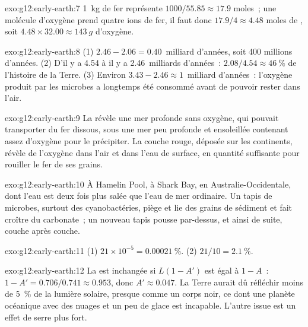 \begin{solution}{exo:g12:early-earth:7}
\qty{1}{kg} de fer représente $1000/55.85 \approx 17.9$ moles~; une
molécule d'oxygène prend quatre ions de fer, il faut donc
$17.9/4 \approx 4.48$ moles de
, soit $4.48 \times 32.00 \approx \qty{143}{g}$ d'oxygène.
\end{solution}

\begin{solution}{exo:g12:early-earth:8}
(1) $2.46 - 2.06 = 0.40$~milliard d'années, soit 400 millions d'années.
(2) D'il y a 4.54 à il y a 2.46~milliards d'années~:
$2.08/4.54 \approx \qty{46}{\percent}$ de l'histoire de la Terre.
(3) Environ $3.43 - 2.46 \approx 1$~milliard d'années~: l'oxygène produit
par les microbes a longtemps été consommé avant de pouvoir rester dans
l'air.
\end{solution}

\begin{solution}{exo:g12:early-earth:9}
La  révèle une mer profonde sans oxygène, qui
pouvait transporter du fer dissous, sous une mer peu profonde et ensoleillée
contenant assez d'oxygène pour le précipiter. La couche rouge, déposée sur
les continents, révèle de l'oxygène dans l'air et dans l'eau de surface, en
quantité suffisante pour rouiller le fer de ses grains.
\end{solution}

\begin{solution}{exo:g12:early-earth:10}
À Hamelin Pool, à Shark Bay, en Australie-Occidentale, dont l'eau est deux
fois plus salée que l'eau de mer ordinaire. Un tapis de microbes, surtout
des cyanobactéries, piège et lie des grains de sédiment et fait croître du
carbonate~; un nouveau tapis pousse par-dessus, et ainsi de suite, couche
après couche.
\end{solution}

\begin{solution}{exo:g12:early-earth:11}
(1) $21 \times 10^{-5} = \qty{0.00021}{\percent}$. (2) $21/10 =
\qty{2.1}{\percent}$.
\end{solution}

\begin{solution}{exo:g12:early-earth:12}
La  est inchangée si $L(1 - A')$ est égal à $1 - A$~:
$1 - A' = 0.706/0.741 \approx 0.953$, donc $A' \approx 0.047$. La Terre
aurait dû réfléchir moins de \qty{5}{\percent} de la lumière solaire,
presque comme un corps noir, ce dont une planète océanique avec des nuages
et un peu de glace est incapable. L'autre issue est un effet de serre plus
fort.
\end{solution}

